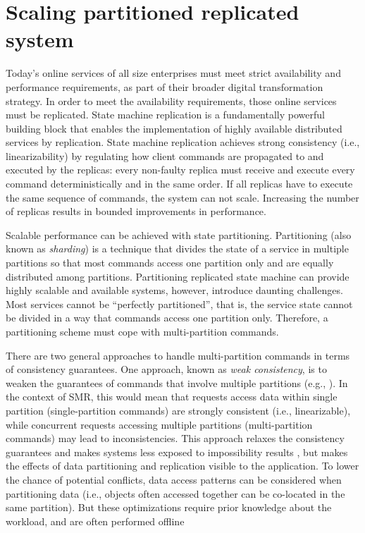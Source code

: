 \chapter[Scaling partitioned replicated system]{Scaling partitioned replicated system}

Today's online services of all size enterprises must meet strict availability
and performance requirements, as part of their broader digital transformation
strategy. In order to meet the availability requirements, those online services
must be replicated. State machine replication is a fundamentally powerful
building block that enables the implementation of highly available distributed
services by replication. State machine replication achieves strong consistency
(i.e., linearizability) by regulating how client commands are propagated to and
executed by the replicas: every non-faulty replica must receive and execute
every command deterministically and in the same order. If all replicas have to
execute the same sequence of commands, the system can not scale. Increasing the
number of replicas results in bounded improvements in performance.

Scalable performance can be achieved with state partitioning. Partitioning (also
known as \emph{sharding}) is a technique that divides the state of a service in
multiple partitions so that most commands access one partition only and are
equally distributed among partitions. Partitioning replicated state machine can
provide highly scalable and available systems, however, introduce daunting
challenges. Most services cannot be ``perfectly partitioned'', that is, the
service state cannot be divided in a way that commands access one partition
only. Therefore, a partitioning scheme must cope with multi-partition commands.

There are two general approaches to handle multi-partition commands in terms of
consistency guarantees. One approach, known as \emph{weak consistency}, is to
weaken the guarantees of commands that involve multiple partitions (e.g.,
\cite{facebookTAO}). In the context of SMR, this would mean that requests access
data within single partition (single-partition commands) are strongly consistent
(i.e., linearizable), while concurrent requests accessing multiple partitions
(multi-partition commands) may lead to inconsistencies. This approach relaxes
the consistency guarantees and makes systems less exposed to impossibility
results \cite{FLP85, diskpaxos}, but makes the effects of data partitioning and
replication visible to the application. To lower the chance of potential
conflicts, data access patterns can be considered when partitioning data (i.e.,
objects often accessed together can be co-located in the same partition). But
these optimizations require prior knowledge about the workload, and are often
performed offline \cite{facebookTAO}

